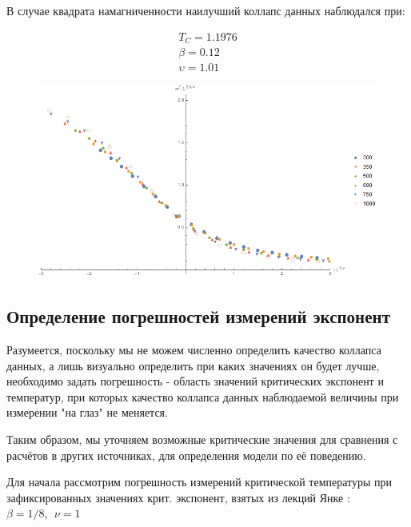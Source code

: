 В случае квадрата намагниченности наилучший коллапс данных наблюдался при:

\begin{align*}
    T_{C} = 1.1976 \\
    \beta = 0.12 \\
    \upsilon = 1.01
\end{align*}

\begin{figure}[!h]
    \centering
    \includegraphics[width=150mm]{Sections/Images/DatColMagn2_3.png}
    \label{fig:DatColM2_3}
\end{figure}

\subsection{Определение погрешностей измерений экспонент}

Разумеется, поскольку мы не можем численно определить качество коллапса данных, а лишь визуально определить при каких значениях он будет лучше, необходимо задать погрешность - область значений критических экспонент и температур, при которых качество коллапса данных наблюдаемой величины при измерении "на глаз" не меняется.

Таким образом, мы уточняем возможные критические значения для сравнения с расчётов в других источниках, для определения модели по её поведению.

Для начала рассмотрим погрешность измерений критической температуры при зафиксированных значениях крит. экспонент, взятых из лекций Янке \cite{Yanke}:
$\beta = 1/8,\ \ \nu = 1$


